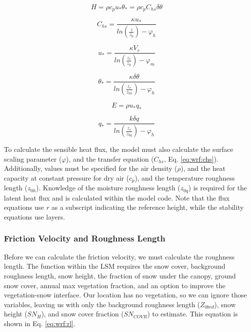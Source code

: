 {\begin{equation}\label{eq:wrf:h}
H = \rho c_{p} u_{*} \theta_{*} = \rho c_{p} C_{hs} \delta \theta
\end{equation}

\begin{equation}\label{eq:wrf:chs}
C_{hs} = \frac{\kappa u_{*}}{ln (\frac{z}{z_{0}}) - \varphi_{h}}
\end{equation}

\begin{equation}\label{eq:wrf:ustar}
u_{*} = \frac{\kappa V_{r}}{ln(\frac{z_{r}}{z_{0}}) - \varphi_{m}}
\end{equation}

\begin{equation}\label{eq:wrf:thetastar}
\theta_{*} = \frac{\kappa \delta \theta}{ln(\frac{z_{r}}{z_{0h}}) - \varphi_{h}} 
\end{equation}

\begin{equation}\label{eq:wrf:e}
E = \rho u_{*} q_{*}
\end{equation}

\begin{equation}\label{eq:wrf:q*}
q_{*} = \frac{k \delta q}{ln(\frac{z_{r}}{z_{0q}}) - \varphi_{h}}
\end{equation}

To calculate the sensible heat flux, the model must also calculate the surface scaling parameter ($\varphi$), and the transfer equation ($C_{hs}$, Eq. \ref{eq:wrf:chs}). Additionally, values must be specified for the air density ($\rho$), and the heat capacity at constant pressure for dry air ($c_{p}$), and the temperature roughness length ($z_{0h}$). Knowledge of the moisture roughness length ($z_{0q}$) is required for the latent heat flux and is calculated within the model code. Note that the flux equations use $r$ as a subscript indicating the reference height, while the stability equations use layers.

\subsubsection{Friction Velocity and Roughness Length}

Before we can calculate the friction velocity, we must calculate the roughness length. The function within the LSM requires the snow cover, background roughness length, snow height, the fraction of snow under the canopy, ground snow cover, annual max vegetation fraction, and an option to improve the vegetation-snow interface. Our location has no vegetation, so we can ignore those variables, leaving us with only the background roughness length ($Z_{0brd}$), snow height ($SN_{H}$), and snow cover fraction ($SN_{COVR}$) to estimate. This equation is shown in Eq. \ref{eq:wrf:rl}.

}
